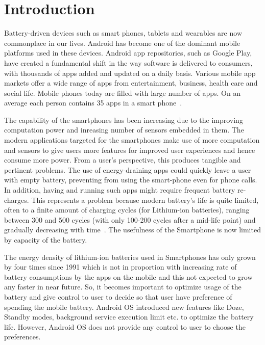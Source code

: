 \section{Introduction}
\label{intro}


Battery-driven devices such as smart phones, tablets and wearables are now commonplace in our lives. Android has become one of the dominant mobile platforms used in these devices. Android app repositories, such as Google Play, have created a fundamental shift in the way software is delivered to consumers, with thousands of apps added and updated on a daily basis. Various mobile app markets offer a wide range of apps from entertainment, business, health care and social life. Mobile phones today are filled with large number of apps. On an average each person contains 35 apps in a smart phone~\cite{thinkwithgoogle}. 

The capability of the smartphones has been increasing due to the improving computation power and inreasing number of sensors embedded in them. The modern applications targeted for the smartphones make use of more computation and sensors to give users more features for improved user experiences  and hence consume more power. From a user’s perspective, this produces tangible and pertinent problems. The use of energy-draining apps could quickly leave a user with empty battery, preventing from using the smart-phone even for phone calls. In addition, having and running such apps might require frequent battery re-charges. This represents a problem because modern battery’s life is quite limited, often to a finite amount of charging cycles (for Lithium-ion batteries), ranging between 300 and 500 cycles (with only 100-200 cycles after a mid-life point) and gradually decreasing with time~\cite{linares2014mining}. The usefulness of the Smartphone is now limited by capacity of the battery.

The energy density of lithium-ion batteries used in Smartphones has only grown by four times since 1991 which is not in proportion with increasing rate of battery consumptions by the apps on the mobile and this not expected to grow any faster in near future. So, it becomes important to optimize usage of the battery and give control to user to decide so that user have preference of spending the mobile battery. Android OS introduced new features  like Doze, Standby modes, background service execution limit etc. to optimize the battery life. However, Android OS does not provide any control to user to choose the preferences.


